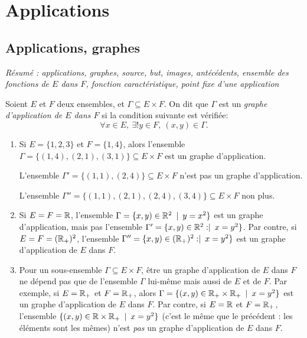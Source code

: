 \chapter{Applications}
\minitoc
\hyperlink{toc}{\retourTOC}

\section{Applications, graphes}

\emph{Résumé : applications, graphes, source, but, images, antécédents, ensemble des fonctions de $E$ dans $F$, fonction caractéristique, point fixe d'une application}

\begin{definition}\label{def-graphe}
Soient $E$ et $F$ deux ensembles, et $\Gamma \subseteq E\times F$. On dit que $\Gamma$ est un \emph{graphe d'application de $E$ dans $F$} si la condition suivante est vérifiée:
\[\forall x\in E, \: \exists! y\in F, \: (x,y) \in \Gamma.\]
\end{definition}

\begin{exemple}
\begin{enumerate}
\item Si $E = \{1,2,3\}$ et $F = \{1,4\}$, alors l'ensemble $\Gamma = \{(1,4),(2,1),(3,1)\} \subseteq E\times F$ est un graphe d'application.

L'ensemble $\Gamma' = \{(1,1),(2,4)\} \subseteq E\times F$ n'est pas un graphe d'application.

L'ensemble $\Gamma'' = \{(1,1),(2,1),(2,4),(3,4)\} \subseteq E\times F$ non plus.
\item Si $E = F = \mathbb{R}$, l'ensemble $\Gamma = \{x,y)\in \mathbb{R}^2 \:\mid\: y=x^2\}$ est un graphe d'application, mais pas l'ensemble $\Gamma' = \{x,y)\in \mathbb{R}^2 :\mid\: x=y^2\}$. Par contre, si $E=F=(\mathbb{R}_+)^2$, l'ensemble  $\Gamma'' = \{x,y)\in (\mathbb{R}_+)^2 :\mid\: x=y^2\}$ est un graphe d'application de $E$ dans $F$.
\item Pour un sous-ensemble $\Gamma\subseteq E\times F$, être un graphe d'application de $E$ dans $F$ ne dépend pas que de l'ensemble $\Gamma$ lui-même mais aussi de $E$ et de $F$. Par exemple, si $E=\mathbb{R}_+$ et $F=\mathbb{R}_+$, alors $\Gamma = \{(x,y)\in \mathbb{R}_+\times \mathbb{R}_+ \:\mid\: x=y^2\}$ est un graphe d'application de $E$ dans $F$. Par contre, si $E=\mathbb{R}$ et $F=\mathbb{R}_+$, l'ensemble $\{(x,y)\in \mathbb{R}\times \mathbb{R}_+ \:\mid\: x=y^2\}$ (c'est le même que le précédent : les éléments sont les mêmes) n'est \emph{pas} un graphe d'application de $E$ dans $F$.
\end{enumerate}
\end{exemple}

